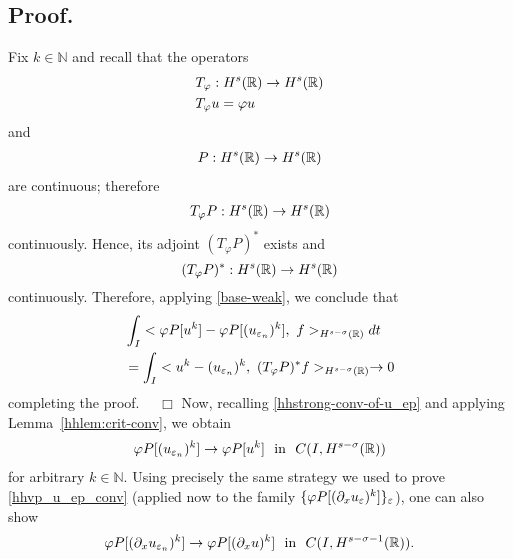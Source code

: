 \subsection{Proof.} 
Fix $k \in \mathbb{N}$ and recall that the operators 
\begin{equation*}
\begin{split}
& T_\varphi: H^s(\mathbb{R}) \to H^s(\mathbb{R})\\
& T_\varphi u = \varphi u
\end{split}
\end{equation*}
and 
\begin{equation*}
\begin{split}
P:H^s(\mathbb{R}) \to H^s(\mathbb{R})
\end{split}
\end{equation*}
are continuous; therefore 
\begin{equation*}
\begin{split}
T_\varphi P: H^s(\mathbb{R}) \to H^s(\mathbb{R})
\end{split}
\end{equation*}
continuously. Hence, its adjoint  $(T_\varphi P)^*$
exists and
\begin{equation*}
(T_\varphi P)^*: H^s(\mathbb{R}) \to H^s(\mathbb{R}) 
\end{equation*}
continuously. Therefore, applying \eqref{base-weak}, we conclude that
\begin{equation}
\label{widpseudo}
\begin{split}
& \int_I <\varphi P[u^k] - \varphi
P [(u_{\varepsilon_n})^k],\  f>_{H^{s-\sigma }(\mathbb{R})} dt
\\
&= \int_I <u^k - 
(u_{\varepsilon_n})^k, \ (T_\varphi P)^* f>_{H^{s-\sigma }(\mathbb{R})} \to 0
\end{split}
\end{equation}
completing the proof. $\quad \Box$
%
%
Now, recalling \eqref{hhstrong-conv-of-u_ep} and applying Lemma~\ref{hhlem:crit-conv}, we obtain
\begin{equation}
\begin{split}
\varphi P [(u_{\varepsilon_n})^k] \to \varphi P [u^k] \ \ \text{in}  \ \ C(I,
H^{s-\sigma}(\mathbb{R}))
\label{hhvp_u_ep_conv}
\end{split}
\end{equation}
for arbitrary $k \in \mathbb{N}$.  Using precisely the same
strategy we used to prove \eqref{hhvp_u_ep_conv} (applied now to
the family $\{ \varphi P [(\partial_x u_{\varepsilon})^k] \}_\varepsilon$), one can also show
\begin{equation}
\begin{split}
\vp P [ (\p_x u_{\ee_n})^k] \to \vp P [(\p_x u)^k] \ \ \text{in}  \ \ C(I,
H^{s-\sigma -1 }(\rr)).
\end{split}
\end{equation}
